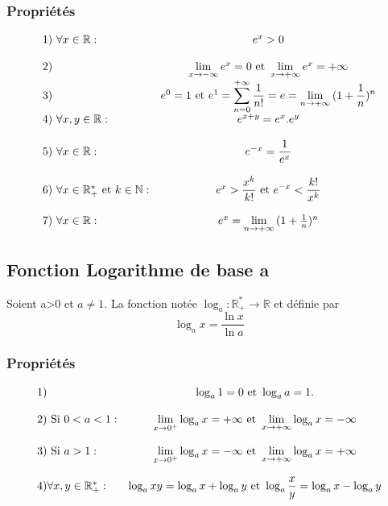 \documentclass[oneside,11pt,french,table]{book}
\theoremstyle{definition}
\theoremstyle{plain}
\theoremstyle{remark}
\begin{document}
 \subsubsection{Propriétés}
 \begin{equation*}
     \begin{array}{l c }
          1)\text{ } \forall x\in \mathbb{R}: &  e^x>0
          \\
          \\
          2)
         &\lim\limits_{x\to -\infty}{e^x}=0 \text{ et }  \lim\limits_{x\to +\infty}{e^x}=+\infty
         \\
         3) & e^0=1 \text{ et } e^1=\displaystyle\sum_{n=0}^{+\infty}\frac{1}{n!}= e =\lim\limits_{n\to +\infty}{(1+\displaystyle\frac{1}{n})^n}\\
         4)\text{ } \forall x,y\in \mathbb{R}: & e^{x+y}=e^x.e^y
         \\
         \\
         5)\text{ } \forall x\in \mathbb{R}:& e^{-x}=\displaystyle\frac{1}{e^x}
         \\
         \\
         6)\text{ } \forall x\in \mathbb{R}_+^* \text{ et } k\in \mathbb{N}: & e^x>\displaystyle\frac{x^k}{k!} \text{ et } e^{-x}<\displaystyle\frac{k!}{x^k}\\
         \\
         7)\text{ } \forall x\in \mathbb{R}: & e^x=\lim\limits_{n\to + \infty}{(1+\frac{1}{n})^n}
     \end{array}
 \end{equation*}
 \subsection{Fonction Logarithme de base a}
 Soient a>0 et $a\neq 1$. La fonction notée $\log_a:\mathbb{R}_+^*\to \mathbb{R}$ et définie par $$\log_a{x}=\displaystyle
\frac{\ln{x}}{\ln{a}} $$
 \subsubsection{Propriétés}
 \begin{equation*}
     \begin{array}{l c}
     
        1)   & \log_a{1}=0 \text{ et } \log_a{a}=1.  \\
        \\
         2) \text{ Si } 0<a<1: & \lim\limits_{x\to 0^+}{\log_a{x}}=+\infty \text{ et } \lim\limits_{x\to +\infty}{\log_a{x}}=-\infty\\
         \\
         3) \text{ Si } a>1 : & \lim\limits_{x\to 0^+}{\log_a{x}}=-\infty \text{ et } \lim\limits_{x\to +\infty}{\log_a{x}}=+\infty\\
         \\
         4) \forall x,y\in\mathbb{R}_+^* : & \log_a{xy}=\log_a{x}+\log_a{y} \text{ et } \log_a{\displaystyle\frac{x}{y}}=\log_a{x}-\log_a{y}
     \end{array}
 \end{equation*}
\end{document}
